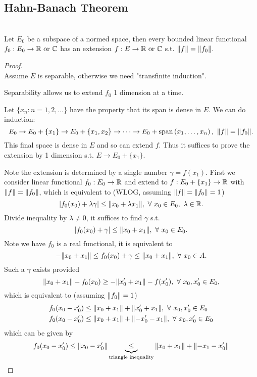 \subsection{Hahn-Banach Theorem}
\begin{theorem}\label{HB thm}\ \\
Let $E_0$ be a subspace of a normed space, then every bounded linear functional $f_0: E_0 \to \mathbb{R} \text{ or } \mathbb{C}$ has an extension $f: E \to \mathbb{R} \text{ or } \mathbb{C}$ s.t. $\norm{f} = \norm{f_0}$.
\end{theorem}
\begin{proof}\ \\
Assume $E$ is separable, otherwise we need "transfinite induction". 
\begin{remark}
Separability allows us to extend $f_0$ 1 dimension at a time.
\end{remark}
Let $\{x_n: n = 1,2,\dots\}$ have the property that its span is dense in $E$. We can do induction:
\begin{equation*}
    E_0 \to E_0 + \{x_1\} \to E_0 + \{x_1,x_2\} \to \dots \to E_0 + \vspan{x_1,\dots,x_n},\ \norm{f} = \norm{f_0}.
\end{equation*}
This final space is dense in $E$ and so can extend $f$. Thus it suffices to prove the extension by 1 dimension s.t. $E \to E_0 + \{x_1\}$.

\np Note the extension is determined by a single number $\gamma = f(x_1)$. First we consider linear functional $f_0: E_0 \to \mathbb{R}$ and extend to $f: E_0 + \{x_1\} \to \mathbb{R}$ with $\norm{f} = \norm{f_0}$, which is equivalent to (WLOG, assuming $\norm{f} = \norm{f_0} = 1$)
\begin{equation*}
    \abs{f_0(x_0) + \lambda \gamma} \leq \norm{x_0 + \lambda x_1},\ \forall\ x_0 \in E_0,\ \lambda \in \mathbb{R}.
\end{equation*}
Divide inequality by $\lambda \neq 0$, it suffices to find $\gamma$ s.t.
\begin{equation*}
    \abs{f_0(x_0) + \gamma} \leq \norm{x_0 + x_1},\ \forall\ x_0 \in E_0.
\end{equation*}
Note we have $f_0$ is a real functional, it is equivalent to
\begin{equation*}
    - \norm{x_0 + x_1} \leq f_0(x_0) + \gamma \leq \norm{x_0 + x_1},\ \forall\ x_0 \in A.
\end{equation*}
Such a $\gamma$ exists provided
\begin{equation*}
    \norm{x_0 + x_1} - f_0(x_0) \geq - \norm{x_0'+ x_1} - f(x_0'),\ \forall\ x_0,x_0' \in E_0,
\end{equation*}
which is equivalent to (assuming $\norm{f_0} = 1$)
\begin{align*}
    f_0(x_0 - x_0') &\leq \norm{x_0 + x_1} + \norm{x_0' + x_1},\ \forall\ x_0,x_0' \in E_0\\
    f_0(x_0 - x_0') &\leq \norm{x_0 + x_1} + \norm{-x_0' - x_1},\ \forall\ x_0,x_0' \in E_0
\end{align*}
which can be given by
\begin{equation*}
    f_0(x_0 - x_0') \leq \norm{x_0 - x_0'} \underbrace{\leq}_{\text{triangle inequality}} \norm{x_0 + x_1} + \norm{-x_1 - x_0'}
\end{equation*}


\end{proof}
